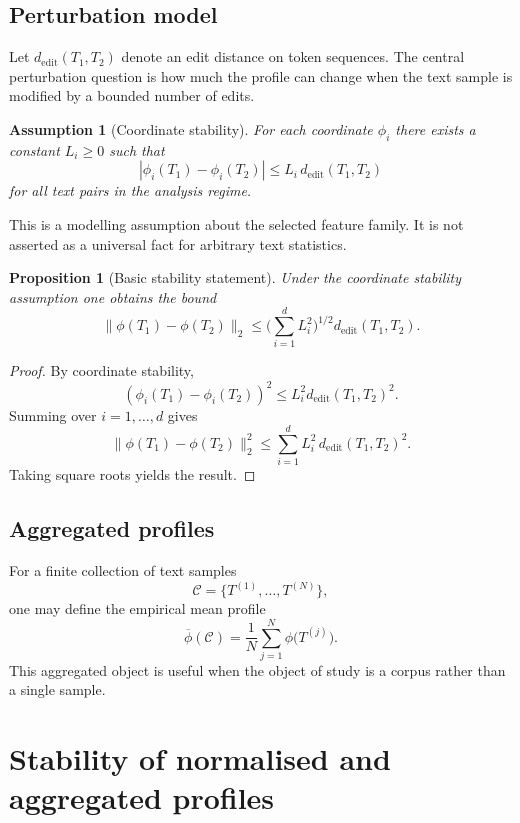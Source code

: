 \documentclass[11pt]{article}
\newtheorem{assumption}[definition]{Assumption}
\newtheorem{proposition}[definition]{Proposition}
\begin{document}
\subsection{Perturbation model}

Let $d_{\mathrm{edit}}(T_1, T_2)$ denote an edit distance on token sequences. The central perturbation question is how much the profile can change when the text sample is modified by a bounded number of edits.

\begin{assumption}[Coordinate stability]
For each coordinate $\phi_i$ there exists a constant $L_i \geq 0$ such that
\[
|\phi_i(T_1) - \phi_i(T_2)| \leq L_i\, d_{\mathrm{edit}}(T_1, T_2)
\]
for all text pairs in the analysis regime.
\end{assumption}

This is a modelling assumption about the selected feature family. It is not asserted as a universal fact for arbitrary text statistics.

\begin{proposition}[Basic stability statement]
Under the coordinate stability assumption one obtains the bound
\[
\|\phi(T_1) - \phi(T_2)\|_2 \leq \Big(\sum_{i=1}^{d} L_i^2\Big)^{1/2} d_{\mathrm{edit}}(T_1, T_2).
\]
\end{proposition}

\begin{proof}
By coordinate stability,
\[
(\phi_i(T_1) - \phi_i(T_2))^2 \leq L_i^2 d_{\mathrm{edit}}(T_1, T_2)^2.
\]
Summing over $i = 1, \dots, d$ gives
\[
\|\phi(T_1) - \phi(T_2)\|_2^2 \leq \sum_{i=1}^{d} L_i^2\, d_{\mathrm{edit}}(T_1, T_2)^2.
\]
Taking square roots yields the result.
\end{proof}

\subsection{Aggregated profiles}

For a finite collection of text samples
\[
\mathcal{C} = \{T^{(1)}, \ldots, T^{(N)}\},
\]
one may define the empirical mean profile
\[
\overline{\phi}(\mathcal{C}) = \frac{1}{N} \sum_{j=1}^{N} \phi\big(T^{(j)}\big).
\]
This aggregated object is useful when the object of study is a corpus rather than a single sample.

\section{Stability of normalised and aggregated profiles}
\end{document}
